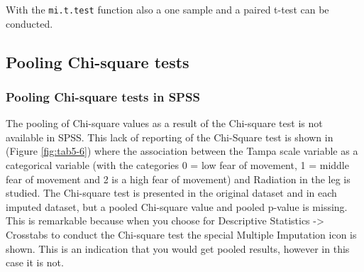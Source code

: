 \documentclass[]{book}
\begin{document}
With the \texttt{mi.t.test} function also a one sample and a paired
t-test can be conducted.

\subsection{Pooling Chi-square tests}\label{pooling-chi-square-tests}

\subsubsection{Pooling Chi-square tests in
SPSS}\label{pooling-chi-square-tests-in-spss}

The pooling of Chi-square values as a result of the Chi-square test is
not available in SPSS. This lack of reporting of the Chi-Square test is
shown in (Figure \ref{fig:tab5-6}) where the association between the
Tampa scale variable as a categorical variable (with the categories 0 =
low fear of movement, 1 = middle fear of movement and 2 is a high fear
of movement) and Radiation in the leg is studied. The Chi-square test is
presented in the original dataset and in each imputed dataset, but a
pooled Chi-square value and pooled p-value is missing. This is
remarkable because when you choose for Descriptive Statistics
-\textgreater{} Crosstabs to conduct the Chi-square test the special
Multiple Imputation icon is shown. This is an indication that you would
get pooled results, however in this case it is not.
\end{document}

